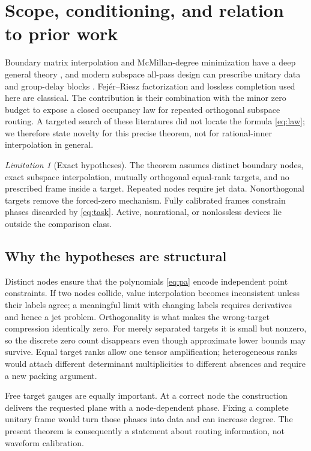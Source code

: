 \documentclass[11pt]{article}
\theoremstyle{definition}\newtheorem{definition}[theorem]{Definition}\newtheorem{example}[theorem]{Example}
\theoremstyle{remark}\newtheorem{remark}[theorem]{Remark}\newtheorem{limitation}[theorem]{Limitation}
\begin{document}
\section{Scope, conditioning, and relation to prior work}

Boundary matrix interpolation and McMillan-degree minimization have a deep
general theory \cite{AntoulasEtAl1990,BallKim1994}, and modern subspace
all-pass design can prescribe unitary data and group-delay blocks
\cite{BharathEtAl2023}.  Fej\'er--Riesz factorization and lossless completion
used here are classical.  The contribution is their combination with the
minor zero budget to expose a closed occupancy law for repeated orthogonal
subspace routing.  A targeted search of these literatures did not locate the
formula \eqref{eq:law}; we therefore state novelty for this precise theorem,
not for rational-inner interpolation in general.

\begin{limitation}[Exact hypotheses]
The theorem assumes distinct boundary nodes, exact subspace interpolation,
mutually orthogonal equal-rank targets, and no prescribed frame inside a
target.  Repeated nodes require jet data.  Nonorthogonal targets remove the
forced-zero mechanism.  Fully calibrated frames constrain phases discarded
by \eqref{eq:task}.  Active, nonrational, or nonlossless devices lie outside
the comparison class.
\end{limitation}

\subsection{Why the hypotheses are structural}

Distinct nodes ensure that the polynomials \eqref{eq:pa} encode independent
point constraints.  If two nodes collide, value interpolation becomes
inconsistent unless their labels agree; a meaningful limit with changing
labels requires derivatives and hence a jet problem.  Orthogonality is what
makes the wrong-target compression identically zero.  For merely separated
targets it is small but nonzero, so the discrete zero count disappears even
though approximate lower bounds may survive.  Equal target ranks allow one
tensor amplification; heterogeneous ranks would attach different
determinant multiplicities to different absences and require a new packing
argument.

Free target gauges are equally important.  At a correct node the construction
delivers the requested plane with a node-dependent phase.  Fixing a complete
unitary frame would turn those phases into data and can increase degree.
The present theorem is consequently a statement about routing information,
not waveform calibration.
\end{document}

